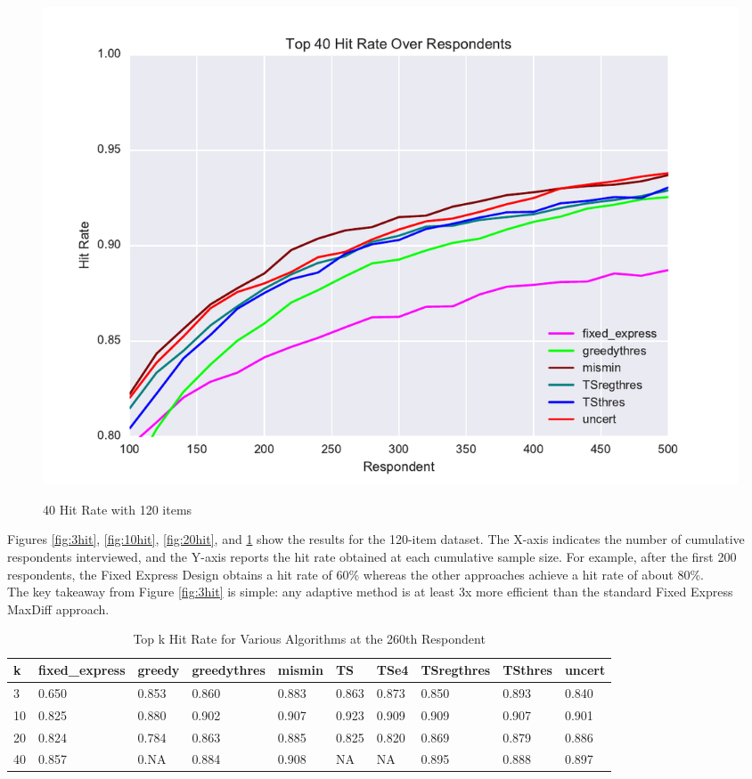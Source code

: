 \documentclass[nonblindrev]{informs3}
\begin{document}
\begin{figure}
\caption{40 Hit Rate with 120 items}
\includegraphics[width=1\textwidth]{plots/hr120v20k40.pdf}
\label{fig:40hit}
\end{figure}
Figures \ref{fig:3hit}, \ref{fig:10hit}, \ref{fig:20hit}, and \ref{fig:40hit} show the results for the 120-item dataset.  The X-axis indicates the number of cumulative respondents interviewed, and the Y-axis reports the hit rate obtained at each cumulative sample size.  For example, after the first 200 respondents, the Fixed Express Design obtains a hit rate of 60\% whereas the other approaches achieve a hit rate of about 80\%.\\
The key takeaway from Figure \ref{fig:3hit} is simple: any adaptive method is at least 3x more efficient than the standard Fixed Express MaxDiff approach.
\begin{table}
\begin{center}
\begin{tabular}{llllllllll}
\hline   k &  fixed\_express &  greedy &  greedythres &  mismin &    TS &  TSe4 &  TSregthres &  TSthres &  uncert \\ \hline  3 &          0.650 &   0.853 &        0.860 &   0.883 & 0.863 & 0.873 &       0.850 &    0.893 &   0.840 \\  10 &          0.825 &   0.880 &        0.902 &   0.907 & 0.923 & 0.909 &       0.909 &    0.907 &   0.901 \\  20 &          0.824 &   0.784 &        0.863 &   0.885 & 0.825 & 0.820 &       0.869 &    0.879 &   0.886 \\  40 &          0.857 &   0.NA &        0.884 &   0.908 & NA & NA &       0.895 &    0.888 &   0.897\end{tabular}
\end{center}
\caption{Top k Hit Rate for Various Algorithms at the 260th Respondent}
\label{table:at260}
\end{table}
\end{document}
